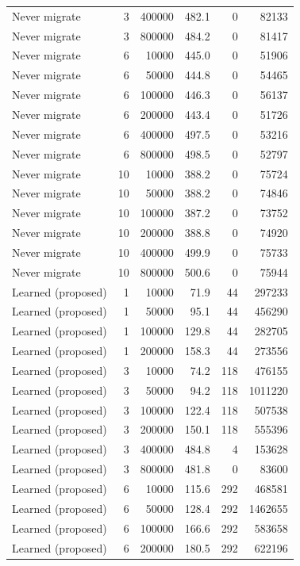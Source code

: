 \begin{table}[h]
\begin{tabular}{@{}lrrrrr@{}}
Never migrate & 3 & 400000 & 482.1 & 0 & 82133 \\
Never migrate & 3 & 800000 & 484.2 & 0 & 81417 \\
Never migrate & 6 & 10000 & 445.0 & 0 & 51906 \\
Never migrate & 6 & 50000 & 444.8 & 0 & 54465 \\
Never migrate & 6 & 100000 & 446.3 & 0 & 56137 \\
Never migrate & 6 & 200000 & 443.4 & 0 & 51726 \\
Never migrate & 6 & 400000 & 497.5 & 0 & 53216 \\
Never migrate & 6 & 800000 & 498.5 & 0 & 52797 \\
Never migrate & 10 & 10000 & 388.2 & 0 & 75724 \\
Never migrate & 10 & 50000 & 388.2 & 0 & 74846 \\
Never migrate & 10 & 100000 & 387.2 & 0 & 73752 \\
Never migrate & 10 & 200000 & 388.8 & 0 & 74920 \\
Never migrate & 10 & 400000 & 499.9 & 0 & 75733 \\
Never migrate & 10 & 800000 & 500.6 & 0 & 75944 \\
Learned (proposed) & 1 & 10000 & 71.9 & 44 & 297233 \\
Learned (proposed) & 1 & 50000 & 95.1 & 44 & 456290 \\
Learned (proposed) & 1 & 100000 & 129.8 & 44 & 282705 \\
Learned (proposed) & 1 & 200000 & 158.3 & 44 & 273556 \\
Learned (proposed) & 3 & 10000 & 74.2 & 118 & 476155 \\
Learned (proposed) & 3 & 50000 & 94.2 & 118 & 1011220 \\
Learned (proposed) & 3 & 100000 & 122.4 & 118 & 507538 \\
Learned (proposed) & 3 & 200000 & 150.1 & 118 & 555396 \\
Learned (proposed) & 3 & 400000 & 484.8 & 4 & 153628 \\
Learned (proposed) & 3 & 800000 & 481.8 & 0 & 83600 \\
Learned (proposed) & 6 & 10000 & 115.6 & 292 & 468581 \\
Learned (proposed) & 6 & 50000 & 128.4 & 292 & 1462655 \\
Learned (proposed) & 6 & 100000 & 166.6 & 292 & 583658 \\
Learned (proposed) & 6 & 200000 & 180.5 & 292 & 622196 \\

\end{tabular}
\end{table}
